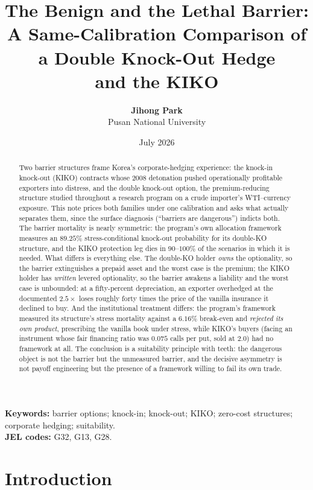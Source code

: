 \documentclass[11pt,a4paper]{article}
\title{\textbf{The Benign and the Lethal Barrier:\\
A Same-Calibration Comparison of a Double Knock-Out Hedge\\
and the KIKO}}
\author{\textbf{Jihong Park} \\ Pusan National University}
\date{July 2026}
\begin{document}
\maketitle

\begin{abstract}
Two barrier structures frame Korea's corporate-hedging experience: the knock-in knock-out (KIKO) contracts whose 2008 detonation pushed operationally profitable exporters into distress, and the double knock-out option, the premium-reducing structure studied throughout a research program on a crude importer's WTI--currency exposure. This note prices both families under one calibration and asks what actually separates them, since the surface diagnosis (``barriers are dangerous'') indicts both. The barrier mortality is nearly symmetric: the program's own allocation framework measures an $89.25\%$ stress-conditional knock-out probability for its double-KO structure, and the KIKO protection leg dies in $90$--$100\%$ of the scenarios in which it is needed. What differs is everything else. The double-KO holder \emph{owns} the optionality, so the barrier extinguishes a prepaid asset and the worst case is the premium; the KIKO holder has \emph{written} levered optionality, so the barrier awakens a liability and the worst case is unbounded: at a fifty-percent depreciation, an exporter overhedged at the documented $2.5\times$ loses roughly forty times the price of the vanilla insurance it declined to buy. And the institutional treatment differs: the program's framework measured its structure's stress mortality against a $6.16\%$ break-even and \emph{rejected its own product}, prescribing the vanilla book under stress, while KIKO's buyers (facing an instrument whose fair financing ratio was $0.075$ calls per put, sold at $2.0$) had no framework at all. The conclusion is a suitability principle with teeth: the dangerous object is not the barrier but the unmeasured barrier, and the decisive asymmetry is not payoff engineering but the presence of a framework willing to fail its own trade.
\end{abstract}

\noindent\textbf{Keywords:} barrier options; knock-in; knock-out; KIKO; zero-cost structures; corporate hedging; suitability.\\
\textbf{JEL codes:} G32, G13, G28.

\section{Introduction}
\label{sec:intro}
\end{document}
